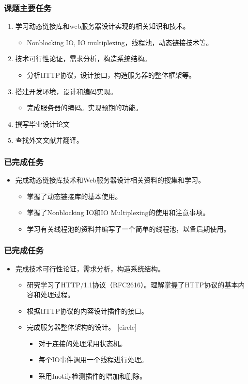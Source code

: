 \documentclass[12pt]{beamer}
\begin{document}
\begin{CJK}{UTF8}{gbsn}
\begin{frame}
	\frametitle{课题主要任务}
	\begin{enumerate}
		\item 学习动态链接库和web服务器设计实现的相关知识和技术。
			\begin{itemize}
				\item Nonblocking IO, IO multiplexing，线程池，动态链接技术等。
			\end{itemize}
		\pause
		\item 技术可行性论证，需求分析，构造系统结构。
			\begin{itemize}
				\item 分析HTTP协议，设计接口，构造服务器的整体框架等。
			\end{itemize}
		\pause
		\item 搭建开发环境，设计和编码实现。
			\begin{itemize}
				\item 完成服务器的编码。实现预期的功能。
			\end{itemize}
		\pause
		\item 撰写毕业设计论文
		\pause
		\item 查找外文文献并翻译。
	\end{enumerate}
\end{frame}

\begin{frame}
	\frametitle{已完成任务}
	\begin{itemize}
		\item 完成动态链接库技术和Web服务器设计相关资料的搜集和学习。
		\pause
		\begin{itemize}
			\item 掌握了动态链接库的基本使用。
			\item 掌握了Nonblocking IO和IO Multiplexing的使用和注意事项。
			\item 学习有关线程池的资料并编写了一个简单的线程池，以备后期使用。
		\end{itemize}
	\end{itemize}
\end{frame}

\begin{frame}
	\frametitle{已完成任务}
	\begin{itemize}
		\item 完成技术可行性论证，需求分析，构造系统结构。
		\pause
		\begin{itemize}
			\item 研究学习了HTTP/1.1协议（RFC2616）。理解掌握了HTTP协议的基本内容和处理过程。
			\item 根据HTTP协议的内容设计插件的接口。
			\item 完成服务器整体架构的设计。
			\pause
			\begin{itemize}
				\item 对于连接的处理采用状态机。
				\item 每个IO事件调用一个线程进行处理。
				\item 采用Inotify检测插件的增加和删除。
			\end{itemize}
		\end{itemize}
	\end{itemize}
\end{frame}


\end{CJK}
\end{document}
